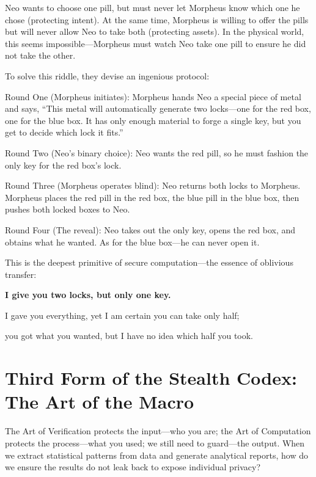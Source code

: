 \vspace{1em}

Neo wants to choose one pill, but must never let Morpheus know which one he chose (protecting intent). At the same time, Morpheus is willing to offer the pills but will never allow Neo to take both (protecting assets). In the physical world, this seems impossible---Morpheus must watch Neo take one pill to ensure he did not take the other.

\vspace{1em}

To solve this riddle, they devise an ingenious protocol:

Round One (Morpheus initiates): Morpheus hands Neo a special piece of metal and says, ``This metal will automatically generate two locks---one for the red box, one for the blue box. It has only enough material to forge a single key, but you get to decide which lock it fits.''

Round Two (Neo's binary choice): Neo wants the red pill, so he must fashion the only key for the red box's lock.

Round Three (Morpheus operates blind): Neo returns both locks to Morpheus. Morpheus places the red pill in the red box, the blue pill in the blue box, then pushes both locked boxes to Neo.

Round Four (The reveal): Neo takes out the only key, opens the red box, and obtains what he wanted. As for the blue box---he can never open it.

This is the deepest primitive of secure computation---the essence of oblivious transfer:

\textbf{I give you two locks, but only one key.}

\begin{importantbox}
I gave you everything, yet I am certain you can take only half;

you got what you wanted, but I have no idea which half you took.

\end{importantbox}

\newpage
\section{Third Form of the Stealth Codex: The Art of the Macro}

The Art of Verification protects the input---who you are;
the Art of Computation protects the process---what you used;
we still need to guard---the output.
When we extract statistical patterns from data and generate analytical reports, how do we ensure the results do not leak back to expose individual privacy?

